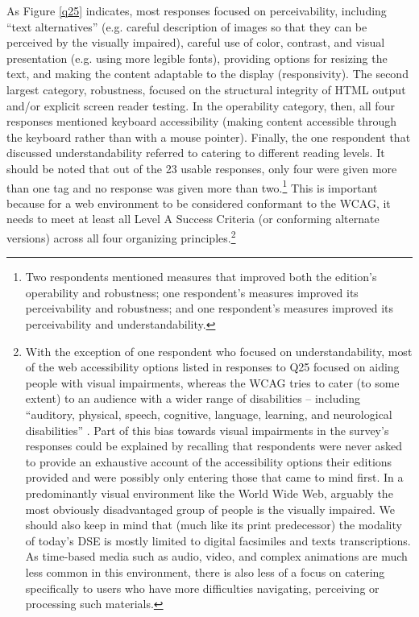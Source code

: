 \begin{paper}
As Figure \ref{q25} indicates, most responses focused on perceivability,
including ``text alternatives'' (e.g. careful description of images so
that they can be perceived by the visually impaired), careful use of
color, contrast, and visual presentation (e.g. using more legible
fonts), providing options for resizing the text, and making the content
adaptable to the display (responsivity). The second largest category,
robustness, focused on the structural integrity of HTML output and/or
explicit screen reader testing. In the operability category, then, all
four responses mentioned keyboard accessibility (making content
accessible through the keyboard rather than with a mouse pointer).
Finally, the one respondent that discussed understandability referred to
catering to different reading levels. It should be noted that out of the
23 usable responses, only four were given more than one tag and no
response was given more than two.\footnote{Two respondents mentioned
  measures that improved both the edition's operability and robustness;
  one respondent's measures improved its perceivability and robustness;
  and one respondent's measures improved its perceivability and
  understandability.} This is important because for a web environment to
be considered conformant to the WCAG, it needs to meet at least all
Level A Success Criteria (or conforming alternate versions) across all
four organizing principles.\footnote{With the exception of one
  respondent who focused on understandability, most of the web
  accessibility options listed in responses to Q25 focused on aiding
  people with visual impairments, whereas the WCAG tries to cater (to
  some extent) to an audience with a wider range of disabilities --
  including ``auditory, physical, speech, cognitive, language, learning,
  and neurological disabilities'' \citep{w3c_web_2018}. Part of this bias towards
  visual impairments in the survey's responses could be explained by
  recalling that respondents were never asked to provide an exhaustive
  account of the accessibility options their editions provided and were
  possibly only entering those that came to mind first. In a
  predominantly visual environment like the World Wide Web, arguably the
  most obviously disadvantaged group of people is the visually impaired.
  We should also keep in mind that (much like its print predecessor) the
  modality of today's DSE is mostly limited to digital facsimiles and
  texts transcriptions. As time-based media such as audio, video, and
  complex animations are much less common in this environment, there is
  also less of a focus on catering specifically to users who have more
  difficulties navigating, perceiving or processing such materials.}


\end{paper}
